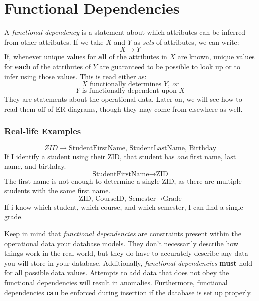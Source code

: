 \documentclass{report}
\begin{document}
    \section{Functional Dependencies}
    A \textit{functional dependency} is a statement about which attributes can be inferred from other attributes. If we take $X$ and $Y$ as \textit{sets} of attributes, we can write:
    $$ X \rightarrow Y$$
    If, whenever unique values for \textbf{all} of the attributes in $X$ are known, unique values for \textbf{each} of the attributes of $Y$ are guaranteed to be possible to look up or to infer using those values.
    This is read either as:
    $$ \text{$X$ functionally determines $Y$}, \ or $$
    $$ Y \text{ is functionally dependent upon } X$$
    They are statements about the operational data. Later on, we will see how to read them off of ER diagrams, though they may come from elsewhere as well.
    \begin{mdframed}
        \vspace{-4mm}\subsubsection*{Real-life Examples}
    $$ ZID \rightarrow \text{StudentFirstName, StudentLastName, Birthday}$$
    If I identify a student using their ZID, that student has \textit{one} first name, last name, and birthday.
    $$ \text{StudentFirstName} \rightarrow  \text{ZID} $$
    The first name is not enough to determine a single ZID, as there are multiple students with the same first name.
    $$ \text{ZID, CourseID, Semester} \rightarrow \text{Grade} $$
    If i know which student, which course, and which semester, I can find a single grade.
\end{mdframed}
\bigbreak \noindent
Keep in mind that \textit{functional dependencies} are constraints present within the operational data your database models. They don't necessarily describe how things work in the real world, but they do have to accurately describe any data you will store in your database. 
\bigbreak \noindent
Additionally, \textit{functional dependencies} \textbf{must} hold for all possible data values. Attempts to add data that does not obey the functional dependencies will result in anomalies. 
\bigbreak \noindent
Furthermore, functional dependencies \textbf{can} be enforced during insertion if the database is set up properly.
\end{document}
